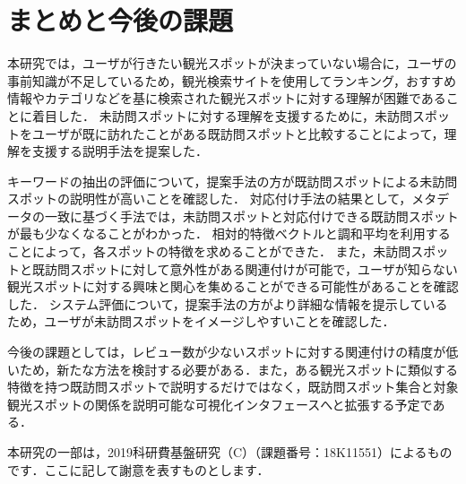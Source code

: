 \documentclass[submit]{ipsj}
\begin{document}
\section{まとめと今後の課題}
\label{sec:まとめと今後の課題}

本研究では，ユーザが行きたい観光スポットが決まっていない場合に，ユーザの事前知識が不足しているため，観光検索サイトを使用してランキング，おすすめ情報やカテゴリなどを基に検索された観光スポットに対する理解が困難であることに着目した．
未訪問スポットに対する理解を支援するために，未訪問スポットをユーザが既に訪れたことがある既訪問スポットと比較することによって，理解を支援する説明手法を提案した．

キーワードの抽出の評価について，提案手法の方が既訪問スポットによる未訪問スポットの説明性が高いことを確認した．
対応付け手法の結果として，メタデータの一致に基づく手法では，未訪問スポットと対応付けできる既訪問スポットが最も少なくなることがわかった．
相対的特徴ベクトルと調和平均を利用することによって，各スポットの特徴を求めることができた．
また，未訪問スポットと既訪問スポットに対して意外性がある関連付けが可能で，ユーザが知らない観光スポットに対する興味と関心を集めることができる可能性があることを確認した．
システム評価について，提案手法の方がより詳細な情報を提示しているため，ユーザが未訪問スポットをイメージしやすいことを確認した．

今後の課題としては，レビュー数が少ないスポットに対する関連付けの精度が低いため，新たな方法を検討する必要がある．また，ある観光スポットに類似する特徴を持つ既訪問スポットで説明するだけではなく，既訪問スポット集合と対象観光スポットの関係を説明可能な可視化インタフェースへと拡張する予定である．



\begin{acknowledgment}
本研究の一部は，2019科研費基盤研究（C）（課題番号：18K11551）によるものです．ここに記して謝意を表すものとします．
\end{acknowledgment}
\end{document}
